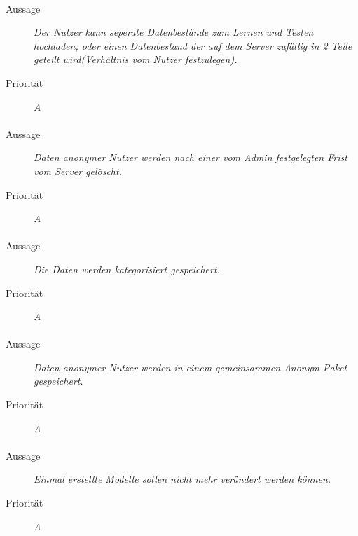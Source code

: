 \paragraph{}
\begin{description}
\item[Aussage] \textit{Der Nutzer kann seperate Datenbestände zum Lernen und Testen hochladen, oder einen Datenbestand der auf dem Server zufällig in 2 Teile geteilt wird(Verhältnis vom Nutzer festzulegen).}
\item[Priorität] \textit{A}
\end{description}

\paragraph{}
\begin{description}
\item[Aussage] \textit{Daten anonymer Nutzer werden nach einer vom Admin festgelegten Frist vom Server gelöscht.}
\item[Priorität] \textit{A}
\end{description}

\paragraph{}
\begin{description}
\item[Aussage] \textit{Die Daten werden kategorisiert gespeichert.}
\item[Priorität] \textit{A}
\end{description}


\paragraph{}
\begin{description}
\item[Aussage] \textit{Daten anonymer Nutzer werden in einem gemeinsammen Anonym-Paket gespeichert.}
\item[Priorität] \textit{A}
\end{description}

\paragraph{}
\begin{description}
\item[Aussage] \textit{Einmal erstellte Modelle sollen nicht mehr verändert werden können.}
\item[Priorität] \textit{A}
\end{description}

